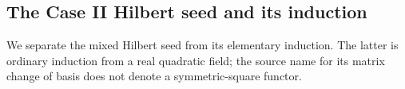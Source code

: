 
\subsection{The Case II Hilbert seed and its induction}
\label{subsec:sr-case-two-seed}
We separate the mixed Hilbert seed from its elementary induction.
The latter is ordinary induction from a real quadratic field; the
source name for its matrix change of basis does not denote a
symmetric-square functor.

